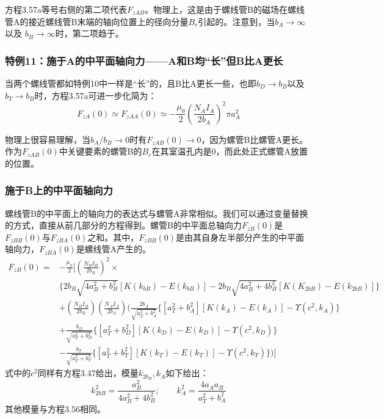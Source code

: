 方程3.57a等号右侧的第二项代表$F_{zAB}$。物理上，这是由于螺线管B的磁场在螺线管A的接近螺线管B末端的轴向位置上的径向分量$B_r$引起的。注意到，当$b_A\rightarrow \infty$以及 $b_B\rightarrow \infty$时，第二项趋于。
\subsubsection{特例11：施于A的中平面轴向力——A和B均“长”但B比A更长}
当两个螺线管都如特例10中一样是“长”的，且B比A更长一些，也即$b_D\rightarrow b_B$以及$b_T\rightarrow b_B$时，方程3.57a可进一步化简为：
\begin{equation}
F_{zA}(0)\simeq F_{zAA}(0)\simeq -\frac{\mu_0}{2}(\frac{N_AI_A}{2b_A})^2\pi a_A^2
\end{equation}

物理上很容易理解，当$b_A/b_B\rightarrow 0$时有$F_{zAB}(0)\rightarrow 0$，因为螺管B比螺管A更长。作为$F_{zAB}(0)$中关键要素的螺管B的$B_r$在其室温孔内是0，而此处正式螺管A放置的位置。

\subsubsection{施于B上的中平面轴向力}
螺线管B的中平面上的轴向力的表达式与螺管A非常相似。我们可以通过变量替换的方式，直接从前几部分的方程得到。螺管B的中平面总轴向力$F_{zB}(0)$是$F_{zBB}(0)$与$F_{zBA}(0)$之和。其中，$F_{zBB}(0)$是由其自身左半部分产生的中平面轴向力，$F_{zBA}(0)$是螺线管A产生的。
\begin{equation}
\begin{split}
F_{zB}(0)=&-\frac{\mu_0}{2}[(\frac{N_BI_B}{2b_B})^2\times\\
&\{2b_B\sqrt{4a_B^2+b_B^2}[K(k_{bB})-E(k_{bB})]-2b_B\sqrt{4a_B^2+4b_B^2}[K(K_{2bB})-E(k_{2bB})]\}\\
&+(\frac{N_BI_B}{2b_B})(\frac{N_AI_A}{2b_A})(\frac{2b_A}{\sqrt{a_T^2+b_A^2}}\{[a_T^2+b_A^2][K(k_A)-E(k_A)]-\Upsilon(c^2,k_A)\}\\
&+\frac{b_D}{\sqrt{a_T^2+b_D^2}}\{[a_T^2+b_D^2][K(k_D)-E(k_D)]-\Upsilon(c^2,k_D)\}\\
&-\frac{b_T}{\sqrt{a_T^2+b_T^2}}\{[a_T^2+b_T^2][K(k_T)-E(k_T)]-\Upsilon(c^2,k_T)\})]
\end{split}
\end{equation}
式中的$c^2$同样有方程3.47给出，模量$k_{2b_B},k_A$如下给出：
\begin{equation}
k_{2bB}^2=\frac{a_B^2}{4a_B^2+4b_B^2};\quad \quad k_A^2=\frac{4a_Aa_B}{a_T^2+b_A^2}
\end{equation}
其他模量与方程3.56相同。

